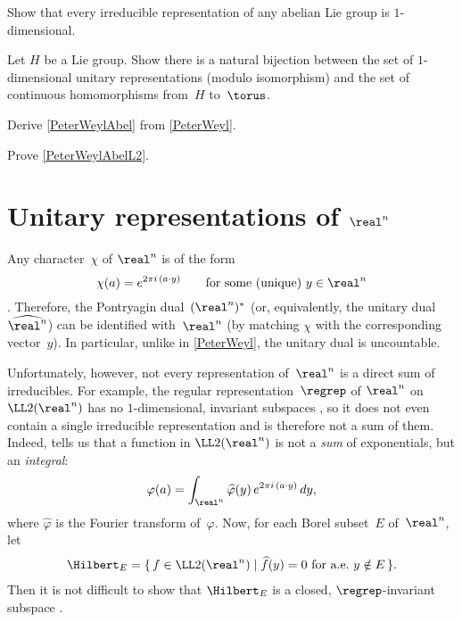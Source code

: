 \begin{exercises}
\item \label{AbelIrred1D}
Show that every irreducible representation of any abelian Lie group is $1$-dimensional.

\item \label{1Drep<>Char}
Let $H$ be a Lie group. Show there is a natural bijection between the set of $1$-dimensional unitary representations (modulo isomorphism) and the set of continuous homomorphisms from~$H$ to~$\torus$.

\item \label{PeterWeylAbelEx}
Derive \cref{PeterWeylAbel} from \cref{PeterWeyl}.

\item \label{PeterWeylAbelL2Ex}
Prove \cref{PeterWeylAbelL2}.

\end{exercises}







\section{Unitary representations of \texorpdfstring{$\real^{\lowercase{n}}$}{Rn}} \label{RepRnSect}

Any character~$\chi$ of $\real^n$ is of the form 
	$$ \chi(a) = e^{2 \pi i \, (a \cdot y)} \qquad
	\text{for some (unique) $y \in \real^n$} $$
.  Therefore, the Pontryagin dual~$(\real^n)^*$ (or, equivalently, the unitary dual~$\widehat{\real^n}$) can be identified with~$\real^n$ (by matching $\chi$ with the corresponding vector~$y$). In particular, unlike in \cref{PeterWeyl}, the unitary dual is uncountable.

Unfortunately, however, not every representation of~$\real^n$ is a direct sum of irreducibles.
For example, the regular representation~$\regrep$ of $\real^n$ on $\LL2(\real^n)$ has no $1$-dimensional, invariant subspaces , so it does not even contain a single irreducible representation and is therefore not a sum of them. Indeed,  tells us that a function in $\LL2(\real^n)$ is not a \emph{sum} of exponentials, but an \emph{integral}:
	$$ \varphi(a) = \int_{\real^n} \widehat\varphi(y) \, e^{2\pi i \, (a \cdot y)} \, dy ,$$
where $\widehat\varphi$ is the Fourier transform of~$\varphi$.
Now, for each Borel subset~$E$ of~$\real^n$, let 
	\begin{align} \label{HEFourier}
	\Hilbert_E = \{\, f \in \LL2(\real^n) \mid \text{$\widehat f(y) = 0$ for a.e.\ $y \notin E$} \,\} 
	. \end{align}
Then it is not difficult to show that $\Hilbert_E$ is a closed, $\regrep$-invariant subspace .

